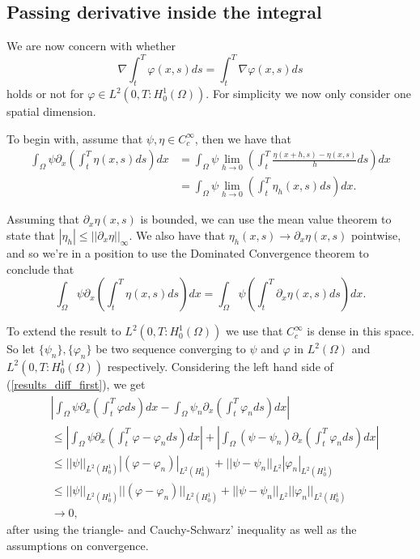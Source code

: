 \documentclass[11pt, a4paper]{article}
\begin{document}
\begin{appendices}
\section{Passing derivative inside the integral}
\label{sec:derivative}

We are now concern with whether
\begin{equation}
\label{diff_int}
	\nabla \int_t^T \varphi(x,s)ds = \int_t^T \nabla\varphi(x,s)ds
\end{equation}
holds or not for $\varphi \in L^2(0,T:H_0^1 (\Omega))$. 
For simplicity we now only consider one spatial dimension.

To begin with, assume that $\psi, \eta \in C^{\infty}_c$, then we have that
\begin{align*}
\int_{\Omega}\psi \partial_x\left(\int_t^T \eta(x,s) ds\right)dx &= \int_{\Omega}\psi \lim_{h \to 0}\left(\int_t^T \frac{\eta(x+h,s)-\eta(x,s)}{h} ds\right)dx\\
&= \int_{\Omega}\psi \lim_{h \to 0}\left(\int_t^T \eta_h(x,s) ds\right)dx.
\end{align*}

Assuming that $\partial_x \eta(x,s)$ is bounded, we can use the mean value theorem to state that $|\eta_h| \leq  ||\partial_x \eta||_\infty$. We also have that $\eta_h(x,s) \to \partial_x \eta(x,s)$ pointwise, and so we're in a position to use the Dominated Convergence theorem to conclude that
\begin{equation}
\label{results_diff_first}
\int_{\Omega}\psi \partial_x\left(\int_t^T \eta(x,s) ds\right)dx = \int_{\Omega}\psi \left(\int_t^T \partial_x\eta(x,s) ds\right)dx.
\end{equation}

To extend the result to $L^2(0,T:H_0^1 (\Omega))$ we use that $C_c^\infty$ is dense in this space. So let $\{\psi_n\},\{\varphi_n\}$ be two sequence converging to $\psi$ and $\varphi$ in $L^2(\Omega)$ and $L^2(0,T:H_0^1(\Omega))$ respectively. Considering the left hand side of (\ref{results_diff_first}), we get
\begin{align*}
&\left|\int_{\Omega}\psi \partial_x \left( \int_t^T\varphi ds \right)dx - \int_{\Omega}\psi_n \partial_x \left( \int_t^T \varphi_n ds \right) dx \right| \\
&\leq  \left| \int_{\Omega} \psi \partial_x \left(\int_t^T \varphi - \varphi_n ds\right)dx \right| + \left| \int_{\Omega}(\psi - \psi_n)\partial_x\left(\int_t^T \varphi_n ds\right) dx \right| \\
&\leq ||\psi||_{L^2(H_0^1)}|(\varphi -\varphi_n)|_{L^2(H_0^1)} + ||\psi-\psi_n||_{L^2}| \varphi_n |_{L^2(H_0^1)} \\
&\leq ||\psi||_{L^2(H_0^1)}||(\varphi -\varphi_n)||_{L^2(H_0^1)} + ||\psi-\psi_n||_{L^2}|| \varphi_n ||_{L^2(H_0^1)} \\
&\to 0,
\end{align*}
after using the triangle- and Cauchy-Schwarz' inequality as well as the assumptions on convergence.


\end{appendices}
\end{document}
